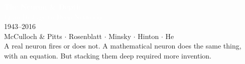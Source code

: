 {
\begin{frame}[plain]
  \centering
  \vspace{1.8cm}
  \textcolor{white}{\Huge\bfseries The Neuron \& Depth}\\[0.5em]
  \textcolor{white}{\Large From Biology to Deep Networks}\\[1em]
  \textcolor{white!80}{\large 1943--2016}\\[1.5em]
  \textcolor{white!60}{\normalsize McCulloch \& Pitts \(\cdot\) Rosenblatt
    \(\cdot\) Minsky \(\cdot\) Hinton \(\cdot\) He}\\[1em]
  \textcolor{white!50}{\small A real neuron fires or does not.
  A mathematical neuron does the same thing,\\with an equation.
  But stacking them deep required more invention.}

\end{frame}
}

